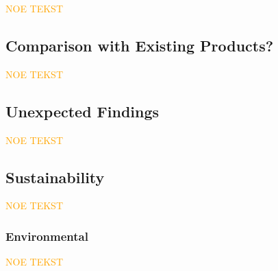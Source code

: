 \textcolor{orange}{NOE TEKST}

\subsection{Comparison with Existing Products?} 

\textcolor{orange}{NOE TEKST}

\subsection{Unexpected Findings} %

\textcolor{orange}{NOE TEKST}

\subsection{Sustainability} %

\textcolor{orange}{NOE TEKST}

\subsubsection*{Environmental}

\textcolor{orange}{NOE TEKST}
\begin{comment}
LENKE FRA PETER: https://www.ntnu.edu/web/excited/sustainability-in-computing-education
- mer lukkede hogstformer og mindre bruk av flatehogst 
- **lavere drivstofforbruk og smartere kjøring med skogsmaskin** 
    - **lavere førerbelastning**
    - **mindre terrengslitasje**
    - **høyere produktivitet**
- produsere tømmer som er mest mulig tilpasset industriens behov 
- **videreutvikle teknologi for driftsoppfølging og førerstøtte for maskinførerne** 

###########################
FNs Bærekraftsmål som virker relevante (KANSKJE SAMMENLIGN MED HVA NORGE GJØR I DAG?):
- 9
- 12 (?) VIRKER SOM DEN FOKUSERER MEST PÅ UTVIKLINGSLAND?
- 15 (?)
\end{comment}

